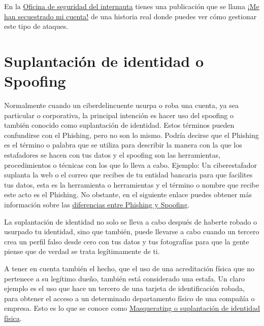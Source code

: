 \documentclass[
  a4paper,
  openany]{book}
\begin{document}
En la \href{https://www.osi.es/es}{Oficina de seguridad del internauta} tienes una publicación que se llama \href{https://www.osi.es/es/actualidad/historias-reales/2021/03/05/me-han-secuestrado-mi-cuenta}{¡Me han secuestrado mi cuenta!} de una historia real donde puedes ver cómo gestionar este tipo de ataques.

\hypertarget{suplantaciuxf3n-de-identidad-o-spoofing}{%
\section{Suplantación de identidad o Spoofing}\label{suplantaciuxf3n-de-identidad-o-spoofing}}

Normalmente cuando un ciberdelincuente usurpa o roba una cuenta, ya sea particular o corporativa, la principal intención es hacer uso del spoofing o también conocido como suplantación de identidad. Estos términos pueden confundirse con el Phishing, pero no son lo mismo. Podría decirse que el Phishing es el término o palabra que se utiliza para describir la manera con la que los estafadores se hacen con tus datos y el spoofing son las herramientas, procedimientos o técnicas con los que lo lleva a cabo. Ejemplo: Un ciberestafador suplanta la web o el correo que recibes de tu entidad bancaria para que facilites tus datos, esta es la herramienta o herramientas y el término o nombre que recibe este acto es el Phishing. No obstante, en el siguiente enlace puedes obtener más información sobre las \href{https://techlandia.com/diferencia-phishing-spoofing-info_241711/}{diferencias entre Phishing y Spoofing}.

La suplantación de identidad no solo se lleva a cabo después de haberte robado o usurpado tu identidad, sino que también, puede llevarse a cabo cuando un tercero crea un perfil falso desde cero con tus datos y tus fotografías para que la gente piense que de verdad se trata legítimamente de ti.

A tener en cuenta también el hecho, que el uso de una acreditación física que no pertenece a su legítimo dueño, también está considerado una estafa. Un claro ejemplo es el uso que hace un tercero de una tarjeta de identificación robada, para obtener el acceso a un determinado departamento físico de una compañía o empresa. Esto es lo que se conoce como \href{https://moodle2019-20.ua.es/moodle/pluginfile.php/113537/mod_resource/content/8/tema/4masquerading_mascarada.html\#:~:text=Consiste\%20en\%20suplantar\%20la\%20identidad,le\%20pertenecen\%20o\%20en\%20persona.}{Masquerating o suplantación de identidad física}.
\end{document}
